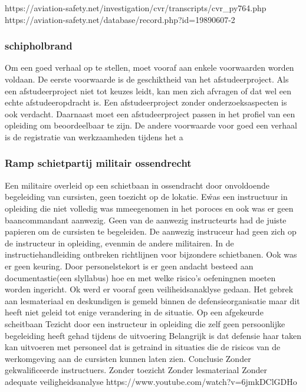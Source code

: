 https://aviation-safety.net/investigation/cvr/transcripts/cvr_py764.php 
https://aviation-safety.net/database/record.php?id=19890607-2 



\subsubsection{schipholbrand}
Om een goed verhaal op te stellen, moet vooraf aan enkele voorwaarden
worden voldaan. De eerste voorwaarde is de geschiktheid van het
afstudeerproject. Als een afstudeerproject niet tot keuzes leidt, kan
men zich afvragen of dat wel een echte afstudeeropdracht is. Een
afstudeerproject zonder onderzoeksaspecten is ook verdacht. Daarnaast
moet een afstudeerproject passen in het profiel van een opleiding om
beoordeelbaar te zijn. De andere voorwaarde voor goed een verhaal is
de registratie van werkzaamheden tijdens het a


\subsubsection{Ramp schietpartij militair ossendrecht }
Een militaire overleid op een schietbaan in ossendracht door onvoldoende begeleiding van cursisten, geen toezicht op de lokatie. E\r was een instructuur in opleiding die niet volledig was mmeegenomen in het poroces en ook was er geen baancommandant aanwezig. Geen van de aanwezig instructeurts had de juiste papieren om de cursisten te begeleiden. De aanwezig instruceur had geen zich op de instructeur in opleiding, evenmin de andere militairen. In de instructiehandleiding ontbreken richtlijnen voor bijzondere schietbanen. Ook was er geen keuring. Door personelstekort is er geen andacht besteed aan documentastie(een slyllabus) hoe en met welke risico’s oefeningnen moeten worden ingericht. Ok werd er vooraf geen veiliheidsanaklyse gedaan. Het gebrek aan lesmateriaal en deskundigen is gemeld binnen de defensieorganisatie maar dit heeft niet geleid tot enige verandering in de situatie.
Op een afgekeurde scheitbaan
Tezicht door een instructeur in opleiding die zelf geen persoonlijke begeleiding heeft gehad tijdens de uitvoering
Belangrijk is dat defensie haar taken kan uitvoeren met personeel dat is getraind in situaties die de risicos van de werkomgeving aan de cursisten kunnen laten zien.
Conclusie
Zonder gekwalificeerde instructuers.
Zonder toezicht
Zonder lesmateriaal
Zonder adequate veiligheidsanalyse
https://www.youtube.com/watch?v=6jmkDClGDHo 




